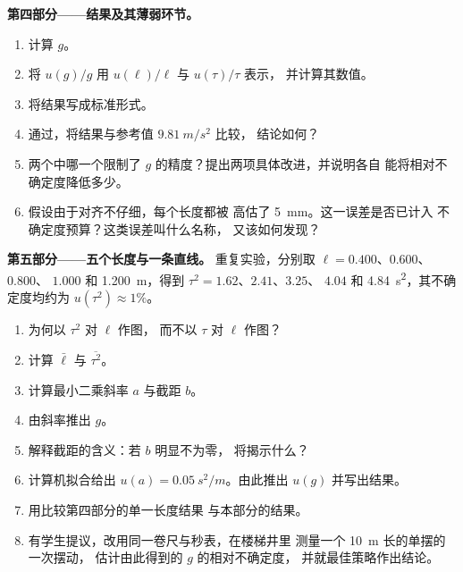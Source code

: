 \begin{problem}
\medskip
\noindent\textbf{第四部分——结果及其薄弱环节。}
\begin{enumerate}[resume]
  \item 计算 $g$。
  \item 将 $u(g)/g$ 用 $u(\ell)/\ell$ 与 $u(\tau)/\tau$ 表示，
        并计算其数值。
  \item 将结果写成标准形式。
  \item 通过，将结果与参考值 $\qty{9.81}{m/s^2}$ 比较，
        结论如何？
  \item 两个中哪一个限制了
        $g$ 的精度？提出两项具体改进，并说明各自
        能将相对不确定度降低多少。
  \item 假设由于对齐不仔细，每个长度都被
        高估了 \qty{5}{mm}。这一误差是否已计入
        不确定度预算？这类误差叫什么名称，
        又该如何发现？
\end{enumerate}

\medskip
\noindent\textbf{第五部分——五个长度与一条直线。}
重复实验，分别取 $\ell = 0.400$、$0.600$、$0.800$、
$1.000$ 和 \qty{1.200}{m}，得到 $\tau^2 = 1.62$、$2.41$、$3.25$、
$4.04$ 和 \qty{4.84}{s^2}，其不确定度均约为 $u(\tau^2) \approx 1\%$。
\begin{enumerate}[resume]
  \item 为何以 $\tau^2$ 对 $\ell$ 作图，
        而不以 $\tau$ 对 $\ell$ 作图？
  \item 计算 $\bar\ell$ 与 $\overline{\tau^2}$。
  \item 计算最小二乘斜率 $a$ 与截距 $b$。
  \item 由斜率推出 $g$。
  \item 解释截距的含义：若 $b$ 明显不为零，
        将揭示什么？
  \item 计算机拟合给出 $u(a) = \qty{0.05}{s^2/m}$。由此推出
        $u(g)$ 并写出结果。
  \item 用比较第四部分的单一长度结果
        与本部分的结果。
  \item 有学生提议，改用同一卷尺与秒表，在楼梯井里
        测量一个 \qty{10}{m} 长的单摆的一次摆动，
        估计由此得到的 $g$ 的相对不确定度，
        并就最佳策略作出结论。
\end{enumerate}
\end{problem}
